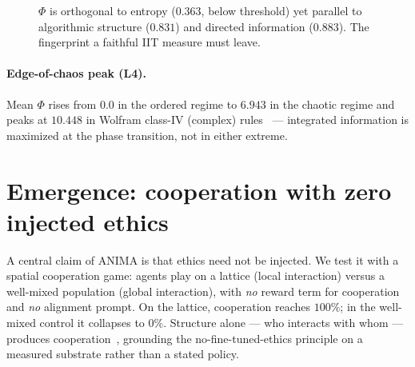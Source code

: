 \documentclass[11pt,a4paper]{article}
\begin{document}
\begin{figure}[h]
\centering
{}
\caption{$\Phi$ is orthogonal to entropy ($0.363$, below threshold) yet parallel
to algorithmic structure ($0.831$) and directed information ($0.883$). The
fingerprint a faithful IIT measure must leave.}
\label{fig:corr}
\end{figure}

\paragraph{Edge-of-chaos peak (L4).}
Mean $\Phi$ rises from $0.0$ in the ordered regime to $6.943$ in the chaotic
regime and peaks at $10.448$ in Wolfram class-IV (complex)
rules~\citep{wolfram2002nks,langton1990edge} --- integrated information is
maximized at the phase transition, not in either extreme.

\section{Emergence: cooperation with zero injected ethics}
\label{sec:emergence}
A central claim of ANIMA is that ethics need not be injected. We test it with a
spatial cooperation game: agents play on a lattice (local interaction) versus a
well-mixed population (global interaction), with \emph{no} reward term for
cooperation and \emph{no} alignment prompt. On the lattice, cooperation reaches
$100\%$; in the well-mixed control it collapses to $0\%$. Structure alone ---
who interacts with whom --- produces cooperation~\citep{nowak2006five}, grounding
the no-fine-tuned-ethics principle on a measured substrate rather than a stated
policy.

\end{document}
